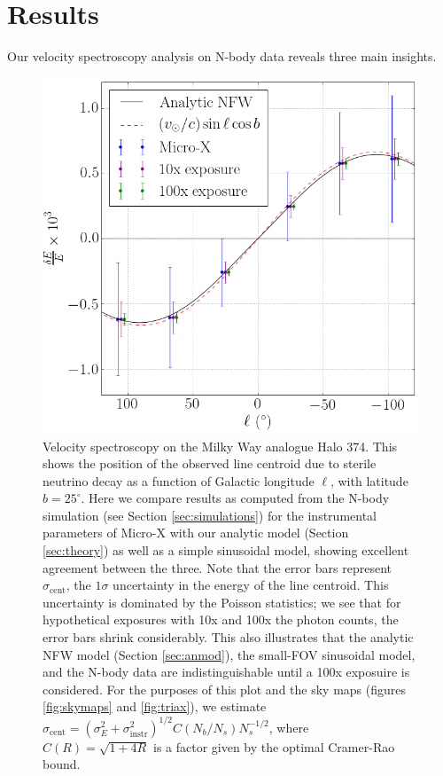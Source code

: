 \documentclass[aps,prd,10pt,twocolumn,superscriptaddress,showpacs,footinbib]{revtex4-1}
\begin{document}
\section{Results}
\label{sec:results}

Our velocity spectroscopy analysis on N-body data reveals three main insights.

\begin{figure}[h!]
\centering
\includegraphics[width=1.0\columnwidth]{de_vs_l.png}
\caption{Velocity spectroscopy on the Milky Way analogue Halo 374. This shows the position of the observed line centroid due to sterile
	neutrino decay as a function of Galactic longitude $\ell$, with latitude $b=25^\circ$.
	Here we compare results as computed from the N-body simulation (see Section \ref{sec:simulations}) for the
	instrumental parameters of Micro-X with our analytic model (Section
	\ref{sec:theory}) as well as a simple sinusoidal model, showing excellent agreement between the
	three. Note that the error bars represent $\sigma_{\mathrm{cent}}$, the $1\sigma$ uncertainty
	in the energy of the line centroid. This uncertainty is dominated by the Poisson statistics; we
	see that for hypothetical exposures with 10x and 100x the photon counts, the error bars shrink
	considerably. This also illustrates that the analytic NFW model (Section \ref{sec:anmod}), the small-FOV
	sinusoidal model, and the N-body data are indistinguishable until a 100x exposuire is
	considered. For the
	purposes of this plot and the sky maps (figures \ref{fig:skymaps} and \ref{fig:triax}), we estimate
	$\sigma_\mathrm{cent} = (\sigma_E^2+\sigma_\mathrm{instr}^2)^{1/2}C(N_b/N_s)N_s^{-1/2}$, where
	$C(R)=\sqrt{1+4R}$ is a factor given by the optimal Cramer-Rao bound.}
\label{fig:de_vs_l}
\end{figure}
\end{document}
